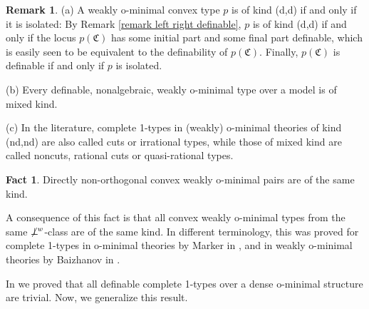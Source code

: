 \documentclass{amsart}
\theoremstyle{definition}
\theoremstyle{definition}
\newtheorem{Fact}[Theorem]{Fact}
\newtheorem{Remark}[Theorem]{Remark}
\newcommand{\nwor}{\not\perp\hspace*{-0.4em}^{\mathit w}}
\newcommand{\Mon}{\mathfrak C}
\begin{document}
\begin{Remark}\label{Remark dd}
(a) A weakly o-minimal convex type $p$ is of kind (d,d) if and only if it is isolated:
By Remark \ref{remark left right definable}, $p$ is of kind (d,d) if and only if the locus $p(\Mon)$ has some initial part and some final part definable, which is easily seen to be equivalent to the definability of $p(\Mon)$. Finally, $p(\Mon)$ is definable if and only if $p$ is isolated. 

(b) Every definable, nonalgebraic, weakly o-minimal type over a model is of mixed kind. 

(c) In the literature, complete 1-types in (weakly) o-minimal theories of kind (nd,nd) are also called cuts or irrational types, while those of mixed kind are called noncuts, rational cuts or quasi-rational types.
\end{Remark}  
 

 
\begin{Fact}\label{Fact direct no preserves the kind}\cite[Lemma 7.17]{MT}
Directly non-orthogonal convex weakly o-minimal pairs are of the same kind.
\end{Fact}

A consequence of this fact is that all convex weakly o-minimal types from the same $\nwor$-class are of the same kind. In different terminology, this was proved for complete 1-types in o-minimal theories by Marker in \cite{Marker1986omitting}, and in weakly o-minimal theories by Baizhanov in \cite{Baizhanov1999}.

In \cite[Proposition 5.18]{MTwqom1} we proved that all definable complete 1-types over a dense o-minimal structure are trivial. Now, we generalize this result.
\end{document}
